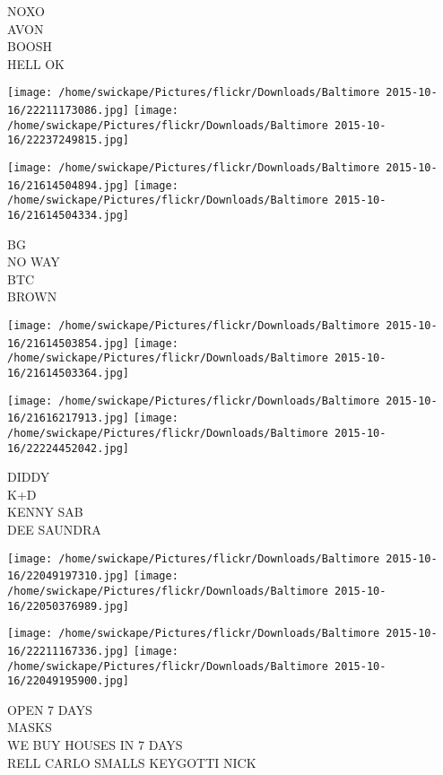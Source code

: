 \documentclass[10pt,letterpaper]{article}
\begin{document}
NOXO\\
AVON\\
BOOSH\\
HELL OK\\
\pagebreak

\texttt{[image: /home/swickape/Pictures/flickr/Downloads/Baltimore 2015-10-16/22211173086.jpg]}
\texttt{[image: /home/swickape/Pictures/flickr/Downloads/Baltimore 2015-10-16/22237249815.jpg]}

\texttt{[image: /home/swickape/Pictures/flickr/Downloads/Baltimore 2015-10-16/21614504894.jpg]}
\texttt{[image: /home/swickape/Pictures/flickr/Downloads/Baltimore 2015-10-16/21614504334.jpg]}

BG\\
NO WAY\\
BTC\\
BROWN\\
\pagebreak

\texttt{[image: /home/swickape/Pictures/flickr/Downloads/Baltimore 2015-10-16/21614503854.jpg]}
\texttt{[image: /home/swickape/Pictures/flickr/Downloads/Baltimore 2015-10-16/21614503364.jpg]}

\texttt{[image: /home/swickape/Pictures/flickr/Downloads/Baltimore 2015-10-16/21616217913.jpg]}
\texttt{[image: /home/swickape/Pictures/flickr/Downloads/Baltimore 2015-10-16/22224452042.jpg]}

DIDDY\\
K+D\\
KENNY SAB\\
DEE SAUNDRA\\
\pagebreak

\texttt{[image: /home/swickape/Pictures/flickr/Downloads/Baltimore 2015-10-16/22049197310.jpg]}
\texttt{[image: /home/swickape/Pictures/flickr/Downloads/Baltimore 2015-10-16/22050376989.jpg]}

\texttt{[image: /home/swickape/Pictures/flickr/Downloads/Baltimore 2015-10-16/22211167336.jpg]}
\texttt{[image: /home/swickape/Pictures/flickr/Downloads/Baltimore 2015-10-16/22049195900.jpg]}

OPEN 7 DAYS\\
MASKS\\
WE BUY HOUSES IN 7 DAYS\\
RELL CARLO SMALLS KEYGOTTI NICK\\
\pagebreak
\end{document}
